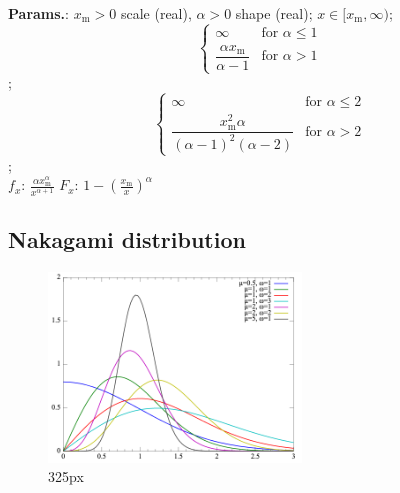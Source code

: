     {\color{darkblue} \textbf{Params.}:} {$x_\mathrm{m} > 0$ scale (real),  $\alpha > 0$ shape (real)}; {$x \in [x_\mathrm{m}, \infty)$}; {$$\begin{cases}
     \infty & \text{for }\alpha\le 1 \\
     \dfrac{\alpha x_\mathrm{m}}{\alpha-1} & \text{for }\alpha>1
   \end{cases}$$}; {$$\begin{cases}
     \infty & \text{for }\alpha\le 2 \\
     \dfrac{x_\mathrm{m}^2\alpha}{(\alpha-1)^2(\alpha-2)} & \text{for }\alpha>2
   \end{cases}$$};\hspace{0.5cm}\\{\color{darkblue} \textbf{$f_x$}:} {$\frac{\alpha x_\mathrm{m}^\alpha}{x^{\alpha+1}}$}{\color{darkblue} \textbf{$F_x$}:} {$1-\left(\frac{x_\mathrm{m}}{x}\right)^\alpha$}



    
        
\subsection{Nakagami distribution}


    \begin{figure}[H]
        \centering
        \includegraphics[width=0.6\textwidth]{images/Nakagami pdf.png}
        \caption{325px}
    \end{figure}




